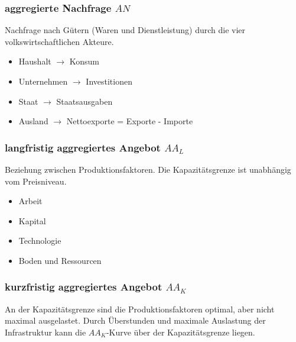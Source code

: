 	\subsubsection{aggregierte Nachfrage $AN$}
	Nachfrage nach Gütern (Waren und Dienstleistung) durch die vier volkswirtschaftlichen Akteure.
	\begin{itemize}
		\item Haushalt $\rightarrow$ Konsum
		\item Unternehmen $\rightarrow$ Investitionen
		\item Staat $\rightarrow$ Staatsausgaben
		\item Ausland $\rightarrow$ Nettoexporte = Exporte - Importe
	\end{itemize}
	\subsubsection{langfristig aggregiertes Angebot $AA_L$}
	Beziehung zwischen Produktionsfaktoren. Die Kapazitätsgrenze ist unabhängig vom Preisniveau.
	\begin{itemize}
		\item Arbeit
		\item Kapital
		\item Technologie
		\item Boden und Ressourcen
	\end{itemize}
	\subsubsection{kurzfristig aggregiertes Angebot $AA_K$}
	An der Kapazitätsgrenze sind die Produktionsfaktoren optimal, aber nicht maximal ausgelastet. Durch Überstunden und maximale Auslastung der Infrastruktur kann die $AA_K$-Kurve über der Kapazitätsgrenze liegen.
\clearpage
\pagebreak
